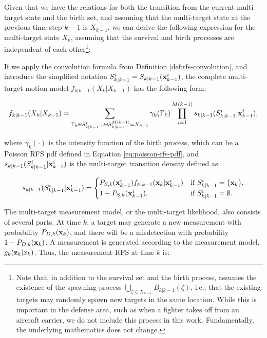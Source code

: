 Given that we have the relations for both the transition from the current multi-target state and the birth set, and assuming that the multi-target state at the previous time step $k-1$ is $X_{k-1}$, we can derive the following expression for the multi-target state $X_k$, assuming that the survival and birth processes are independent of each other\footnote{
Note that, in addition to the survival set and the birth process, \cite{voGaussianMixtureProbability2006} assumes the existence of the spawning process $\bigcup_{\zeta \in X_{k-1}} B_{k|k-1}(\zeta)$, i.e., that the existing targets may randomly spawn new targets in the same location. While this is important in the defense area, such as when a fighter takes off from an aircraft carrier, we do not include this process in this work. Fundamentally, the underlying mathematics does not change.}:

If we apply the convolution formula from Definition \ref{def:rfs-convolution}, and introduce the simplified notation $S_{k|k-1}^i = S_{k|k-1}(\svecat{x}{k-1}{i})$, the complete multi-target motion model $f_{k|k-1}(X_k | X_{k-1})$ has the following form:

\begin{equation}
    f_{k|k-1}(X_k | X_{k-1}) = 
    \sum_{
        \Gamma_k \uplus S_{k|k-1}^1 \ldots \uplus S_{k|k-1}^{M(k-1)} = X_{k-1}
    }
    \gamma_k(\Gamma_k)
    \prod_{i=1}^{M(k-1)}
    s_{k|k-1}(S_{k|k-1}^i | \svecat{x}{k-1}{i}),
\end{equation}

\noindent where $\gamma_k(\cdot)$ is the intensity function of the birth process, which can be a Poisson RFS pdf defined in Equation \ref{eq:poisson-rfs-pdf}, and $s_{k|k-1}(S_{k|k-1}^i | \svecat{x}{k-1}{i})$ is the multi-target transition density defined as:

\begin{equation}
    s_{k|k-1}(S_{k|k-1}^i | \svecat{x}{k-1}{i}) = \begin{cases}
        P_{S,k}(\svecat{x}{k-1}{i})
            f_{k|k-1}(\vecat{x}{k} | \svecat{x}{k-1}{i}) & \text{if } S_{k|k-1}^i = \{\vecat{x}{k}\}, \\
            1 - P_{S,k}(\svecat{x}{k-1}{i}), & \text{if } S_{k|k-1}^i = \emptyset.
    \end{cases}
\end{equation}

The multi-target measurement model, or the multi-target likelihood, also consists of several parts. At time $k$, a target may generate a new measurement with probability $P_{D,k}(\vecat{x}{k})$, and there will be a misdetection with probability $1 - P_{D,k}(\vecat{x}{k})$. A measurement is generated according to the measurement model, $g_{k}(\vecat{z}{k} | x_{k})$. Thus, the measurement RFS at time $k$ is:

